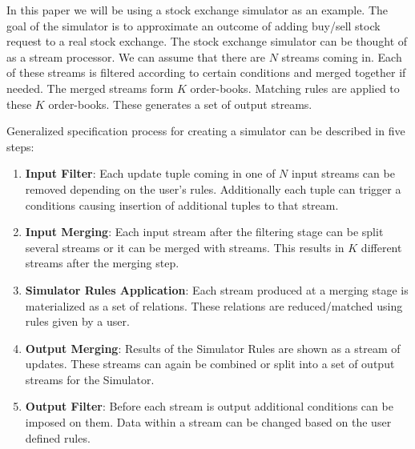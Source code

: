 \documentclass{article}
\begin{document}
In this paper we will be using a stock exchange simulator as an example. The goal of the simulator is to approximate an outcome of adding buy/sell stock request to a real stock exchange. The stock exchange simulator can be thought of as a stream processor. We can assume that there are $N$ streams coming in. Each of these streams is filtered according to certain conditions and merged together if needed. The merged streams form $K$ order-books. Matching rules are applied to these $K$ order-books. These generates a set of output streams.

Generalized specification process for creating a simulator can be described in five steps:

\begin{enumerate}
    \item {\bf Input Filter}: Each update tuple coming in one of $N$ input streams can be removed depending on the user's rules. Additionally each tuple can trigger a conditions causing insertion of additional tuples to that stream. 
    \item {\bf Input Merging}: Each input stream after the filtering stage can be split several streams or it can be merged with streams. This results in $K$ different streams after the merging step.
    \item {\bf Simulator Rules Application}: Each stream produced at a merging stage is materialized as a set of relations. These relations are reduced/matched using rules given by a user.
    \item {\bf Output Merging}: Results of the Simulator Rules are shown as a stream of updates. These streams can again be combined or split into a set of output streams for the Simulator. 
    \item {\bf Output Filter}: Before each stream is output additional conditions can be imposed on them. Data within a stream can be changed based on the user defined rules.
\end{enumerate}
\end{document}

